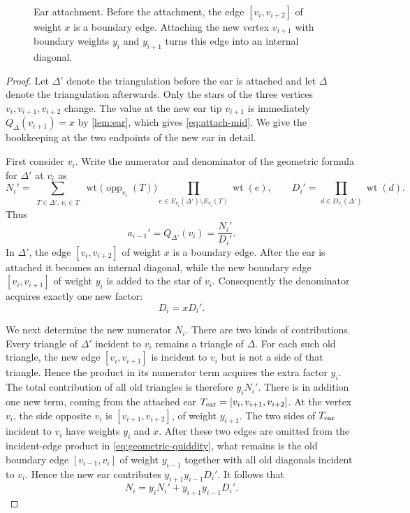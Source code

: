 \documentclass[amstex,11pt,reqno]{amsart}
\theoremstyle{definition}
\newcommand{\wt}{\operatorname{wt}}
\begin{document}
\begin{figure}[h]
\caption{Ear attachment.  Before the attachment, the edge
$[v_i,v_{i+2}]$ of weight $x$ is a boundary edge.
Attaching the new vertex $v_{i+1}$ with boundary weights
$y_i$ and $y_{i+1}$ turns this edge into an internal diagonal.}
\label{fig:ear-attachment}
\end{figure}

\begin{proof}
Let $\Delta'$ denote the triangulation before the ear is attached and let $\Delta$ denote the triangulation afterwards. Only the stars of the three vertices $v_i,v_{i+1},v_{i+2}$ change. The value at the new ear tip $v_{i+1}$ is immediately
$Q_\Delta(v_{i+1})=x$
by \cref{lem:ear}, which gives \eqref{eq:attach-mid}. We give the bookkeeping at the two endpoints of the new ear in detail.

First consider $v_i$. Write the numerator and denominator of the geometric formula for $\Delta'$ at $v_i$ as
\[
 N_i'
 =\sum_{\substack{T\in\Delta',\,v_i\in T}}
 \wt\bigl(\operatorname{opp}_{v_i}(T)\bigr)
 \prod_{e\in E_{v_i}(\Delta')\setminus E_{v_i}(T)}\wt(e),
 \qquad
 D_i'=\prod_{d\in D_{v_i}(\Delta')}\wt(d).
\]
Thus
\[
 a_{i-1}'=Q_{\Delta'}(v_i)=\frac{N_i'}{D_i'}.
\]
In $\Delta'$, the edge $[v_i,v_{i+2}]$ of weight $x$ is a boundary edge. After the ear is attached it becomes an internal diagonal, while the new boundary edge $[v_i,v_{i+1}]$ of weight $y_i$ is added to the star of $v_i$. Consequently the denominator acquires exactly one new factor:
\[
 D_i=xD_i'.
\]

We next determine the new numerator $N_i$. There are two kinds of contributions. Every triangle of $\Delta'$ incident to $v_i$ remains a triangle of $\Delta$. For each such old triangle, the new edge $[v_i,v_{i+1}]$ is incident to $v_i$ but is not a side of that triangle. Hence the product in its numerator term acquires the extra factor $y_i$. The total contribution of all old triangles is therefore
$y_iN_i'$.
There is in addition one new term, coming from the attached ear
$T_{\rm ear}=[v_i,v_{i+1},v_{i+2}]$.
At the vertex $v_i$, the side opposite $v_i$ is $[v_{i+1},v_{i+2}]$, of weight $y_{i+1}$. The two sides of $T_{\rm ear}$ incident to $v_i$ have weights $y_i$ and $x$. After these two edges are omitted from the incident-edge product in \eqref{eq:geometric-quiddity}, what remains is the old boundary edge $[v_{i-1},v_i]$ of weight $y_{i-1}$ together with all old diagonals incident to $v_i$. Hence the new ear contributes $y_{i+1}y_{i-1}D_i'$.
It follows that
\[
 N_i=y_iN_i'+y_{i+1}y_{i-1}D_i'.
\]


\end{proof}
\end{document}
